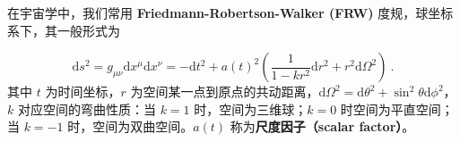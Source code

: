 
在宇宙学中，我们常用 \textbf{Friedmann-Robertson-Walker (FRW)} 度规，球坐标系下，其一般形式为

\begin{equation}
\mathrm{d}s^2=g_{\mu\nu}\mathrm{d}x^{\mu}\mathrm{d}x^{\nu}=-\mathrm{d}t^2+a(t)^2 \left( \frac{1}{1-kr^2}\mathrm{d}r^2+r^2 \mathrm{d} \Omega^2\right)~.
\end{equation}
其中 $t$ 为时间坐标，$r$ 为空间某一点到原点的共动距离，$\mathrm{d} \Omega^2 =\mathrm{d} \theta^2 + \sin^2\theta\mathrm{d} \phi^2 $，$k$ 对应空间的弯曲性质：当 $k=1$ 时，空间为三维球；$k=0$ 时空间为平直空间；当 $k=-1$ 时，空间为双曲空间。$a(t)$ 称为\textbf{尺度因子（scalar factor）}。
